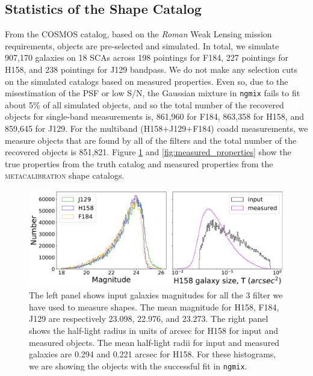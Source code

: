 {\subsection{Statistics of the Shape Catalog}
From the COSMOS catalog, based on the \emph{Roman} Weak Lensing mission requirements, objects are pre-selected and simulated. In total, we simulate 907,170 galaxies on 18 SCAs across 198 pointings for F184, 227 pointings for H158, and 238 pointings for J129 bandpass. We do not make any selection cuts on the simulated catalogs based on measured properties. Even so, due to the misestimation of the PSF or low S/N, the Gaussian mixture in \texttt{ngmix} fails to fit about 5\% of all simulated objects, and so the total number of the recovered objects for single-band measurements is, 861,960 for F184, 863,358 for H158, and 859,645 for J129. For the multiband (H158+J129+F184) coadd measurements, we measure objects that are found by all of the filters and the total number of the recovered objects is 851,821.
Figure \ref{fig:true_properties} and \ref{fig:measured_properties} show the true properties from the truth catalog and measured properties from the \textsc{metacalibration} shape catalogs. 

\begin{figure}
    \hspace*{-1.5cm}
	\includegraphics[scale=0.3]{true_properties.pdf}
	\centering
    \caption{The left panel shows input galaxies magnitudes for all the 3 filter we have used to measure shapes. The mean magnitude for H158, F184, J129 are respectively 23.098, 22.976, and 23.273. The right panel shows the half-light radius in units of arcsec for H158 for input and measured objects. The mean half-light radii for input and measured galaxies are 0.294 and 0.221 arcsec for H158. For these histograms, we are showing the objects with the successful fit in \texttt{ngmix}.}
    \label{fig:true_properties}
\end{figure}

}
